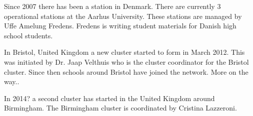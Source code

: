 Since 2007 there has been a \hisparc station in Denmark. There are currently 3 operational stations at the Aarhus University. These stations are managed by Uffe Amelung Fredens. Fredens is writing student materials for Danish high school students.

In Bristol, United Kingdom a new cluster started to form in March 2012. This was initiated by Dr. Jaap Velthuis who is the cluster coordinator for the Bristol cluster. Since then schools around Bristol have joined the network. More on the way..

In 2014? a second cluster has started in the United Kingdom around Birmingham. The Birmingham cluster is coordinated by Cristina Lazzeroni.
